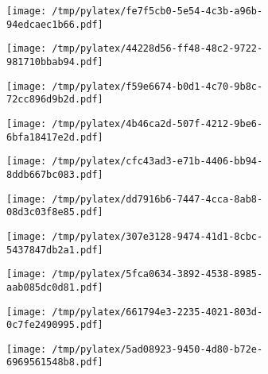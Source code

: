 \documentclass{article}
\begin{document}
\begin{figure}[htbp]
\begin{subfigure}[b]{.3\linewidth}
\texttt{[image: /tmp/pylatex/fe7f5cb0-5e54-4c3b-a96b-94edcaec1b66.pdf]}
\end{subfigure}
\begin{subfigure}[b]{.3\linewidth}
\texttt{[image: /tmp/pylatex/44228d56-ff48-48c2-9722-981710bbab94.pdf]}
\end{subfigure}
\begin{subfigure}[b]{.3\linewidth}
\texttt{[image: /tmp/pylatex/f59e6674-b0d1-4c70-9b8c-72cc896d9b2d.pdf]}
\end{subfigure}
\begin{subfigure}[b]{.3\linewidth}
\texttt{[image: /tmp/pylatex/4b46ca2d-507f-4212-9be6-6bfa18417e2d.pdf]}
\end{subfigure}
\begin{subfigure}[b]{.3\linewidth}
\texttt{[image: /tmp/pylatex/cfc43ad3-e71b-4406-bb94-8ddb667bc083.pdf]}
\end{subfigure}
\begin{subfigure}[b]{.3\linewidth}
\texttt{[image: /tmp/pylatex/dd7916b6-7447-4cca-8ab8-08d3c03f8e85.pdf]}
\end{subfigure}
\begin{subfigure}[b]{.3\linewidth}
\texttt{[image: /tmp/pylatex/307e3128-9474-41d1-8cbc-5437847db2a1.pdf]}
\end{subfigure}
\begin{subfigure}[b]{.3\linewidth}
\texttt{[image: /tmp/pylatex/5fca0634-3892-4538-8985-aab085dc0d81.pdf]}
\end{subfigure}
\begin{subfigure}[b]{.3\linewidth}
\texttt{[image: /tmp/pylatex/661794e3-2235-4021-803d-0c7fe2490995.pdf]}
\end{subfigure}
\begin{subfigure}[b]{.3\linewidth}
\texttt{[image: /tmp/pylatex/5ad08923-9450-4d80-b72e-6969561548b8.pdf]}
\end{subfigure}
\end{figure}
\end{document}
